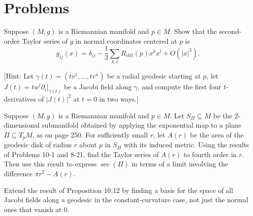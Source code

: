\section{Problems}

\begin{exercise}\label{prob:taylor-series-metric-tensor}
Suppose $(M, g)$ is a Riemannian manifold and $p \in M$. Show that the second-order Taylor series of $g$ in normal coordinates centered at $p$ is
\[
g_{ij}(x) = \delta_{ij} - \frac{1}{3} \sum_{k,l} R_{ikll}(p) x^k x^l + O(|x|^3).
\]

[Hint: Let $\gamma(t) = (tv^1, \ldots, tv^n)$ be a radial geodesic starting at $p$, let $J(t) = tw^i \partial_i|_{\gamma(t)}$ be a Jacobi field along $\gamma$, and compute the first four $t$-derivatives of $|J(t)|^2$ at $t = 0$ in two ways.]
\end{exercise}

\begin{exercise}\label{prob:area-geodesic-disk}
Suppose $(M, g)$ is a Riemannian manifold and $p \in M$. Let $S_\Pi \subseteq M$ be the 2-dimensional submanifold obtained by applying the exponential map to a plane $\Pi \subseteq T_p M$, as on page 250. For sufficiently small $r$, let $A(r)$ be the area of the geodesic disk of radius $r$ about $p$ in $S_\Pi$ with its induced metric. Using the results of Problems 10-1 and 8-21, find the Taylor series of $A(r)$ to fourth order in $r$. Then use this result to express $\sec(\Pi)$ in terms of a limit involving the difference $\pi r^2 - A(r)$.
\end{exercise}

\begin{exercise}\label{prob:jacobi-fields-constant-curvature}
Extend the result of Proposition 10.12 by finding a basis for the space of all Jacobi fields along a geodesic in the constant-curvature case, not just the normal ones that vanish at 0.
\end{exercise}

